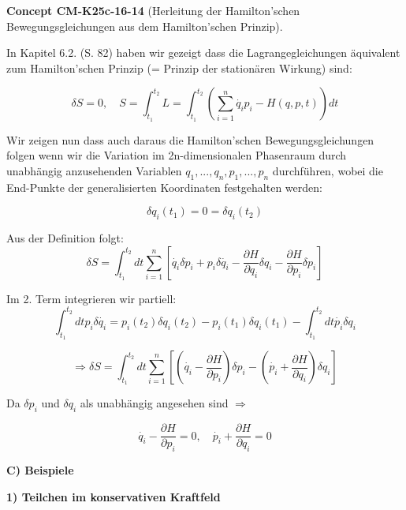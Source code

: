 \documentclass[10pt, letterpaper]{article}
\newcommand{\CustomHeading}[3]{%
  \par\medskip\noindent%
  \textbf{#1 #2} \textnormal{(#3)}.\enskip%
}
\newenvironment{CONC}[2]{\begin{unitbox}\CustomHeading{Concept}{#1}{#2}}{\end{unitbox}}
\begin{document}
\begin{CONC}{CM-K25c-16-14}{Herleitung der Hamilton'schen Bewegungsgleichungen aus dem Hamilton'schen Prinzip}
In Kapitel 6.2. (S. 82) haben wir gezeigt dass die Lagrangegleichungen äquivalent zum Hamilton'schen Prinzip (= Prinzip der stationären Wirkung) sind:

\[\delta S = 0, \quad S = \int_{t_1}^{t_2} L = \int_{t_1}^{t_2} \left(\sum_{i=1}^n \dot{q_i}p_i - H(q,p,t)\right)dt\]

Wir zeigen nun dass auch daraus die Hamilton'schen Bewegungsgleichungen folgen wenn wir die Variation im 2n-dimensionalen Phasenraum durch unabhängig anzusehenden Variablen $q_1,...,q_n, p_1,...,p_n$ durchführen, wobei die End-Punkte der generalisierten Koordinaten festgehalten werden:

\[\delta q_i(t_1) = 0 = \delta q_i(t_2)\]

Aus der Definition folgt:
\[\delta S = \int_{t_1}^{t_2} dt \sum_{i=1}^n \left[\dot{q_i}\delta p_i + p_i\delta\dot{q_i} - \frac{\partial H}{\partial q_i}\delta q_i - \frac{\partial H}{\partial p_i}\delta p_i\right]\]

Im 2. Term integrieren wir partiell:
\[\int_{t_1}^{t_2} dt p_i\delta\dot{q_i} = p_i(t_2)\delta q_i(t_2) - p_i(t_1)\delta q_i(t_1) - \int_{t_1}^{t_2} dt\dot{p_i}\delta q_i\]

\[\Rightarrow \delta S = \int_{t_1}^{t_2} dt \sum_{i=1}^n \left[\left(\dot{q_i} - \frac{\partial H}{\partial p_i}\right)\delta p_i - \left(\dot{p_i} + \frac{\partial H}{\partial q_i}\right)\delta q_i\right]\]

Da $\delta p_i$ und $\delta q_i$ als unabhängig angesehen sind $\Rightarrow$

\[\dot{q_i} - \frac{\partial H}{\partial p_i} = 0, \quad \dot{p_i} + \frac{\partial H}{\partial q_i} = 0\]
\end{CONC}




\textbf{C) Beispiele}

\textbf{1) Teilchen im konservativen Kraftfeld}
\end{document}
